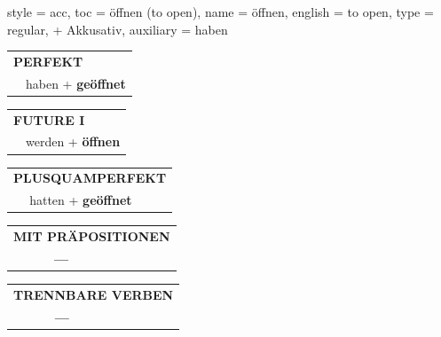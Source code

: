 \begin{verbentry}{
  style = {acc},
  toc = {öffnen (to open)},
  name = {öffnen},
  english = {to open},
  type = {regular, + Akkusativ},
  auxiliary = {haben}
}
 \begin{tabular}{rl}
     \multicolumn{2}{l}{\textbf{PERFEKT}}\\
   & haben + \textbf{geöffnet}\\
  \end{tabular}
\hfill
   \begin{tabular}{rl}
   
    \multicolumn{2}{l}{\textbf{FUTURE I} }\\
  &  werden + \textbf{öffnen}\\
 
  \end{tabular}
\hfill
   \begin{tabular}{rl}
      \multicolumn{2}{l}{\textbf{PLUSQUAMPERFEKT}}\\
  &  hatten + \textbf{geöffnet}\\
  \end{tabular}
  
  
\vspace{10pt}

\begin{tabular}{lll}
\multicolumn{3}{l}{\textbf{MIT PRÄPOSITIONEN}}\\
& \textbf{---} & \\
\end{tabular}
\hfill
\begin{tabular}{lll}
\multicolumn{3}{l}{\textbf{TRENNBARE VERBEN}}\\
& \textbf{---} & \\
\end{tabular}
\vspace{-5pt}
\end{verbentry}


